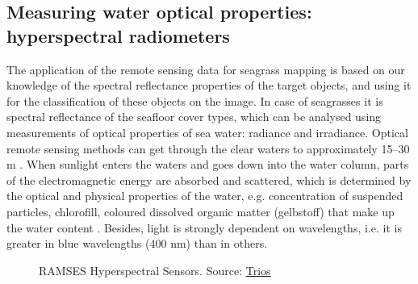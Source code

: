 \documentclass[10pt, a4paper]{article}
\begin{document}
\subsection[Measuring water optical properties]{Measuring water optical properties: \\hyperspectral radiometers}
The application of the remote sensing data for seagrass mapping is based on our knowledge of the
spectral reflectance properties of the target objects, and using it for the classification of these objects
on the image. In case of seagrasses it is spectral reflectance of the seafloor cover types, which can be
analysed using measurements of optical properties of sea water: radiance and irradiance.
Optical remote sensing methods can get through the clear waters to approximately 15–30 m \cite{Mumby04}\label{Mumby04}.
 When sunlight enters the waters and goes down into the water column, parts of the
electromagnetic energy are absorbed and scattered, which is determined by the optical and physical
properties of the water, e.g. concentration of suspended particles, chlorofill, coloured dissolved
organic matter (gelbstoff) that make up the water content \cite{Ackleson2003}\label{Ackleson, 2003}. Besides, light is strongly
dependent on wavelengths, i.e. it is greater in blue wavelengths (400 nm) than in others.

\begin{figure}
	\centering
	\caption{RAMSES Hyperspectral Sensors. Source: \href{http://www.trios.de}{Trios}}
	\label{fig:2.1}
\end{figure}
\end{document}

